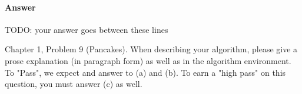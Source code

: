 \documentclass{article}
\begin{document}
\paragraph{Answer}


TODO: your answer goes between these lines



\nextprob
{}

Chapter 1, Problem 9 (Pancakes). When describing your algorithm, please give a
prose explanation (in paragraph form) as well as in the algorithm environment.
To "Pass", we expect and answer to (a) and (b).  To earn a "high pass" on this
question, you must answer (c) as well.
\end{document}
